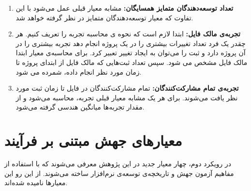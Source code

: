 \begin{enumerate}
\item
\textbf{تعداد توسعه‌دهندگان متمایز همسایگان:}
مشابه معیار قبلی عمل می‌شود با این تفاوت که معیار توسعه‌دهندگان متمایز در نظر گرفته خواهد شد.
\item
\textbf{تجربه‌ی مالک فایل:}
 ابتدا لازم است که نحوه ی محاسبه تجربه را تعریف کنیم. هر چقدر یک فرد تعداد تغییرات بیشتری را در یک پروژه انجام دهد تجربه بیشتری را در آن پروژه دارد و ثبت را می‌توان به ایجاد تغییر تعبیر کرد. برای محاسبه‌ی معیار ابتدا مالک فایل مشخص می شود. سپس تعداد ثبت‌هایی که مالک فایل از ابتدای پروژه تا زمان مورد نظر انجام داده، شمرده می شود.
\item
\textbf{تجربه‌ی تمام مشارکت‌کنندگان:}
تمام مشارکت‌کنندگان در فایل تا زمان ثبت مورد نظر یافت می‌شوند. برای هر یک مشابه معیار قبلی تجربه، محاسبه می‌شود و از مقدار تجربه‌ها میانگین هندسی گرفته می‌شود. 

\end{enumerate}


\section{معیارهای جهش مبتنی بر فرآیند}
\label{sec:method-phase-two}
در رویکرد دوم، چهار معیار جدید در این پژوهش معرفی می‌شوند که با استفاده از مفاهیم آزمون جهش و تاریخچه‌ی توسعه‌ی نرم‌افزار ساخته می‌شوند. از این رو این معیارها   نامیده شده‌اند. 

